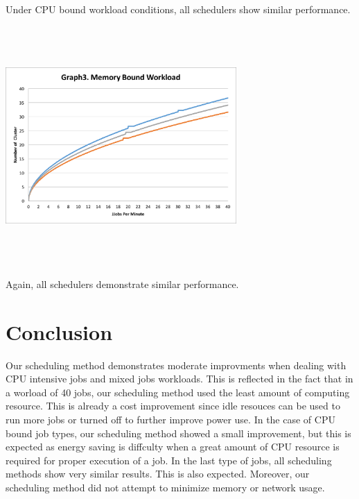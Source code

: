 \documentclass[conference]{IEEEtran}
\begin{document}
Under CPU bound workload conditions, all schedulers show similar performance.\\\\
\newline
\includegraphics[width=8.8cm,height=8.8cm,keepaspectratio]{graph3.png}\\\\
Again, all schedulers demonstrate similar performance.\\
\section{Conclusion}
Our scheduling method demonstrates moderate improvments when dealing with CPU intensive jobs and mixed jobs workloads. This is reflected in the fact that in a worload of 40 jobs, our scheduling method used the least amount of computing resource. This is already a cost improvement since idle resouces can be used to run more jobs or turned off to further improve power use. In the case of CPU bound job types, our scheduling method showed a small improvement, but this is expected as energy saving is diffculty when a great amount of CPU resource is required for proper execution of a job. In the last type of jobs, all scheduling methods show very similar results. This is also expected. Moreover, our scheduling method did not attempt to minimize memory or network usage.






\end{document}
